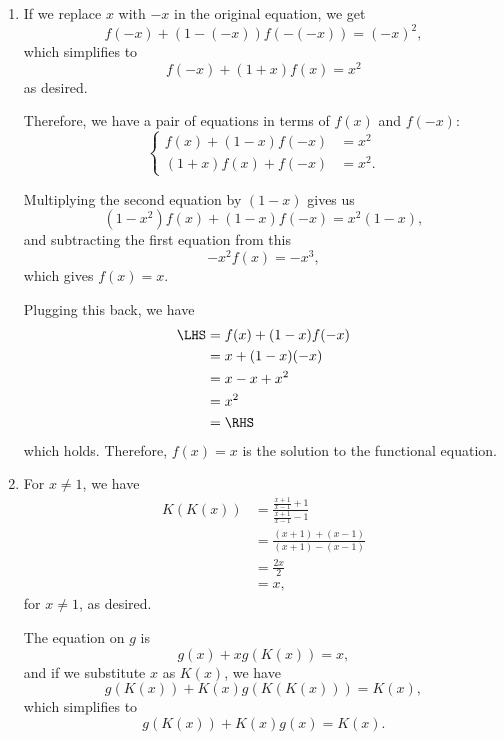 \Question{\currfilebase}

\begin{enumerate}
    \item If we replace \(x\) with \(-x\) in the original equation, we get
          \[
              f(-x) + (1 - (-x))f(-(-x)) = (-x)^2,
          \]
          which simplifies to
          \[
              f(-x) + (1 + x)f(x) = x^2
          \]
          as desired.

          Therefore, we have a pair of equations in terms of \(f(x)\) and \(f(-x)\):
          \[
              \begin{cases}
                  f(x) + (1-x) f(-x) & = x^2  \\
                  (1+x) f(x) + f(-x) & = x^2.
              \end{cases}
          \]

          Multiplying the second equation by \((1-x)\) gives us
          \[
              (1-x^2)f(x) + (1-x)f(-x) = x^2(1-x),
          \]
          and subtracting the first equation from this
          \[
              -x^2 f(x) = -x^3,
          \]
          which gives \(f(x) = x\).

          Plugging this back, we have
          \begin{align*}
              \LHS & = f(x) + (1-x) f(-x) \\
                   & = x + (1-x) (-x)     \\
                   & = x - x + x^2        \\
                   & = x^2                \\
                   & = \RHS
          \end{align*}
          which holds. Therefore, \(f(x) = x\) is the solution to the functional equation.

    \item For \(x \neq 1\), we have
          \begin{align*}
              K(K(x)) & = \frac{\frac{x + 1}{x - 1} + 1}{\frac{x + 1}{x - 1} - 1} \\
                      & = \frac{(x + 1) + (x - 1)}{(x + 1) - (x - 1)}             \\
                      & = \frac{2x}{2}                                            \\
                      & = x,
          \end{align*}
          for \(x \neq 1\), as desired.

          The equation on \(g\) is
          \[
              g(x) + x g(K(x)) = x,
          \]
          and if we substitute \(x\) as \(K(x)\), we have
          \[
              g(K(x)) + K(x) g(K(K(x))) = K(x),
          \]
          which simplifies to
          \[
              g(K(x)) + K(x) g(x) = K(x).
          \]


\end{enumerate}
